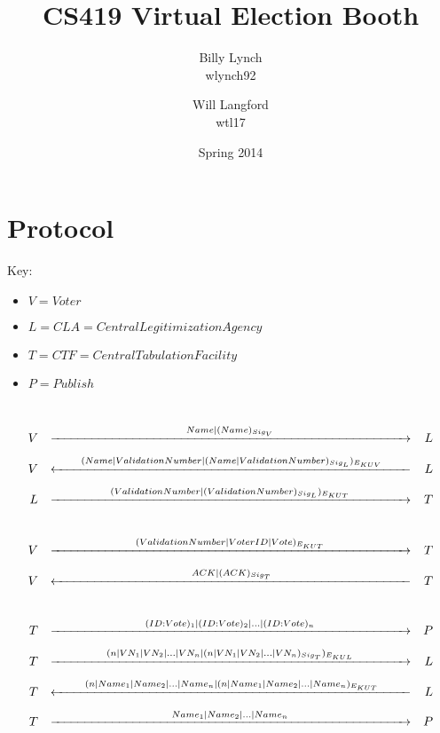 \documentclass{article}
\title{CS419 Virtual Election Booth}
\author{Billy Lynch \\ wlynch92 \and Will Langford \\ wtl17}
\date{Spring 2014}
\begin{document}
\maketitle
\section{Protocol}

Key:
\begin{itemize}[label={}]
	\item $V = Voter$
	\item $L = CLA = Central Legitimization Agency$
	\item $T = CTF = Central Tabulation Facility$
	\item $P = Publish$
\end{itemize}
\hfill\\
\begin{align*}
	V && \xrightarrow[\hspace*{10cm}]{Name|(Name)_{Sig_{V}}} && L \\
	V && \xleftarrow[\hspace*{10cm}]{(Name|Validation Number|(Name|Validation Number)_{Sig_{L}})_{E_{KUV}}} && L \\
	L && \xrightarrow[\hspace*{10cm}]{(Validation Number|(Validation Number)_{Sig_{L}})_{E_{KUT}}} && T \\
	\hfill\\
	V && \xrightarrow[\hspace*{10cm}]{(Validation Number|Voter ID|Vote)_{E_{KUT}}} && T \\
	V && \xleftarrow[\hspace*{10cm}]{ACK|(ACK)_{Sig_{T}}} && T \\
	\hfill\\
	T && \xrightarrow[\hspace*{10cm}]{(ID:Vote)_1|(ID:Vote)_2|\dots|(ID:Vote)_n} && P \\
	T && \xrightarrow[\hspace*{10cm}]{(n|VN_1|VN_2|\dots|VN_n|(n|VN_1|VN_2|\dots|VN_n)_{Sig_T})_{E_{KUL}}} && L \\
	T && \xleftarrow[\hspace*{10cm}]{(n|Name_1|Name_2|\dots|Name_n|(n|Name_1|Name_2|\dots|Name_n)_{E_{KUT}}} && L \\
	T && \xrightarrow[\hspace*{10cm}]{Name_1|Name_2|\dots|Name_n} && P
\end{align*}
\end{document}
